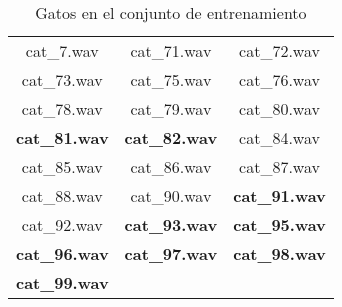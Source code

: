 \documentclass[twocolumn,10pt]{asme2ej}
\begin{document}
\begin{table}[h]
\begin{tabular}{ccc}
cat\_7.wav & cat\_71.wav & cat\_72.wav\\
cat\_73.wav & cat\_75.wav & cat\_76.wav\\
cat\_78.wav & cat\_79.wav & cat\_80.wav\\
\textbf{cat\_81.wav} & \textbf{cat\_82.wav} & cat\_84.wav\\
cat\_85.wav & cat\_86.wav & cat\_87.wav\\
cat\_88.wav & cat\_90.wav & \textbf{cat\_91.wav}\\
cat\_92.wav & \textbf{cat\_93.wav} & \textbf{cat\_95.wav}\\
\textbf{cat\_96.wav} & \textbf{cat\_97.wav} & \textbf{cat\_98.wav}\\
\textbf{cat\_99.wav}
\end{tabular}
\caption{Gatos en el conjunto de entrenamiento}
\label{tbl:conjunto_entre_gato}
\end{table}
\end{document}
